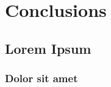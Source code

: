 \chapter*{Conclusions}
\label{chap:concl}

\lipsum[1]

\section{Lorem Ipsum}
\lipsum[2-4]

\subsection{Dolor sit amet}
\lipsum[5-7]